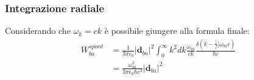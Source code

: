 \documentclass{beamer}
\begin{document}
\begin{frame}
  \frametitle{Integrazione radiale}
  Considerando che $\omega_k = ck$ è possibile giungere alla formula finale:
  \begin{align*}
    W_{ba}^{spont} & = \frac{1}{3\pi\epsilon_0} \left| \mathbf{d}_{ba} \right|^2 \int_0^{\infty} k^2 dk \frac{\omega_{ba}}{ck} \frac{\delta(k - \frac[f]{\omega_{ba}}{c})}{\hbar c}\\
    & = \frac{\omega_{ba}^3}{3\pi\epsilon_0\hbar c^3} \left| \mathbf{d}_{ba} \right|^2
  \end{align*}
\end{frame}
\end{document}
